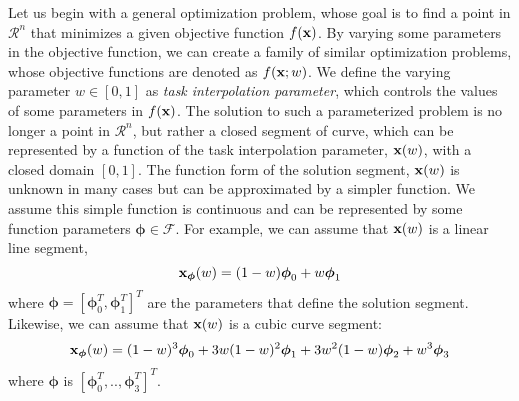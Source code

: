 \label{sec:optskills_param_opt_prob}
Let us begin with a general optimization problem, whose goal is to
find a point in $\mathcal{R}^n$ that minimizes a given objective
function $f(\mathbf{x})$.  By varying some parameters in the objective
function, we can create a family of similar optimization problems,
whose objective functions are denoted as $f(\mathbf{x}; w)$. We define the
varying parameter $w \in [0, 1]$ as \emph{task interpolation
  parameter}, which controls the values of some parameters in
$f(\mathbf{x})$. The solution to such a parameterized problem is no longer
a point in $\mathcal{R}^n$, but rather a closed segment of curve,
which can be represented by a function of the task interpolation
parameter, $\mathbf{x}(w)$, with a closed domain $[0,1]$. The function
form of the solution segment, $\mathbf{x}(w)$ is unknown in many cases but
can be approximated by a simpler function. We assume this simple
function is continuous and can be represented by some function
parameters $\boldsymbol{\phi} \in \mathcal{F}$. For example, we can
assume that $\mathbf{x}(w)$ is a linear line segment,
\begin{equation}
  \mathbf{x}_{\boldsymbol{\phi}}(w) = (1-w)\boldsymbol{\phi}_0 + w\boldsymbol{\phi}_1
  \label{eq:optskills_linear_mean}
\end{equation}
where $\boldsymbol{\phi}=[\boldsymbol{\phi}_0^T, \boldsymbol{\phi}_1^T]^T$ are the
parameters that define the solution segment. Likewise, we can assume
that $\mathbf{x}(w)$ is a cubic curve segment:
  \begin{multline}
    \mathbf{x}_{\boldsymbol{\phi}}(w) = (1-w)^3 \boldsymbol{\phi}_0 + 3w(1-w)^2
    \boldsymbol{\phi}_1 + 3w^2(1-w) \boldsymbol{\phi}_2
    + w^3 \boldsymbol{\phi}_3
    \label{eq:optskills_cubic_mean}
  \end{multline}
  where $\boldsymbol{\phi}$ is $[\boldsymbol{\phi}_0^T,.., \boldsymbol{\phi}_3^T]^T$.

